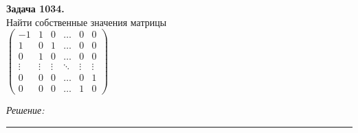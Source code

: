 \documentclass[a4paper, 12pt]{article}
\newenvironment{problem}[2][Задача]
    { \begin{mdframed}[backgroundcolor=gray!10] \textbf{#1 #2.} \\}
    {  \end{mdframed}}
\newenvironment{solution}
    {\textit{Решение: }}
    {\noindent\rule{7in}{1.5pt}}
\begin{document}
\begin{problem}{1034}
Найти собственные значения матрицы\\
$\left( \begin{array}{rrrrrr}-1 & 1 & 0 & \ldots & 0 & 0 \\ 1 & 0 & 1 & \ldots & 0 & 0 \\ 0 & 1 & 0 & \ldots & 0 & 0 \\ \vdots & \vdots & \vdots & \ddots & \vdots & \vdots \\ 0 & 0 & 0 & \ldots & 0 & 1 \\ 0 & 0 & 0 & \ldots & 1 & 0 \end{array} \right)$

\end{problem}
\begin{solution}


\end{solution}
\end{document}

